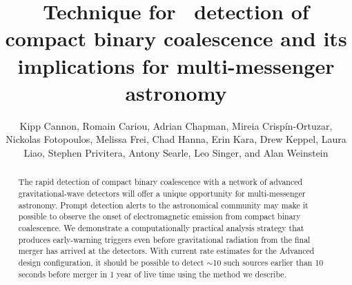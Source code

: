 \documentclass[preprint2]{aastex}
\begin{document}
\title{Technique for \earlywarning\ detection of compact binary coalescence
and its implications for multi-messenger astronomy}


\author{
	Kipp Cannon,
	Romain Cariou,
	Adrian Chapman,
	Mireia Crisp\'{i}n-Ortuzar,
	Nickolas Fotopoulos,
	Melissa Frei,
	Chad Hanna,
	Erin Kara,
	Drew Keppel,
	Laura Liao,
	Stephen Privitera,
	Antony Searle,
	Leo Singer, and
	Alan Weinstein
}



\begin{abstract}
The rapid detection of compact binary coalescence with a network of advanced
gravitational-wave detectors will offer a unique opportunity for
multi-messenger astronomy.  Prompt detection alerts to the astronomical
community may make it possible to observe the onset of electromagnetic emission
from compact binary coalescence.  We demonstrate a computationally practical
analysis strategy that produces early-warning triggers even before
gravitational radiation from the final merger has arrived at the detectors.
With current rate estimates for the Advanced \LIGO{} design configuration, it
should be possible to detect $\sim$10 such sources earlier than 10 seconds
before merger in 1 year of live time using the method we describe.
\end{abstract}
\end{document}

